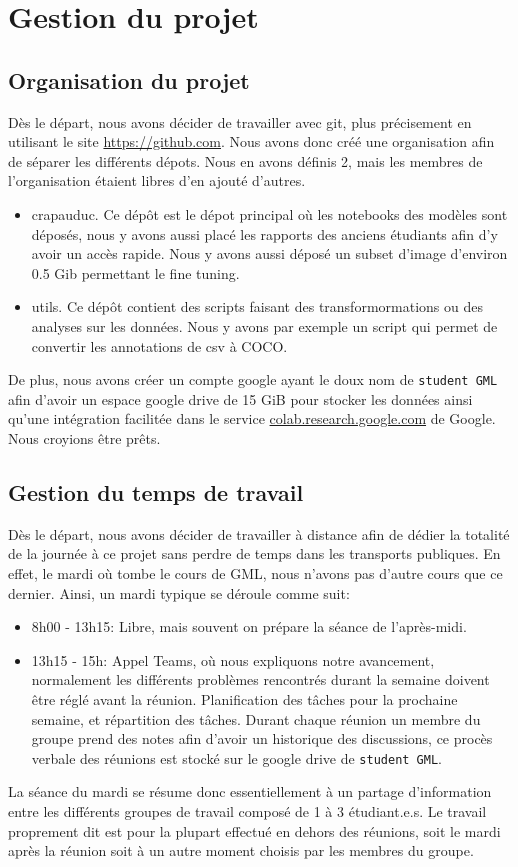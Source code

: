 \chapter{Gestion du projet}
\section{Organisation du projet}
Dès le départ, nous avons décider de travailler avec git, plus précisement 
en utilisant le site \url{https://github.com}. Nous avons donc créé une organisation afin de séparer les différents dépots. Nous en avons définis 2, mais les membres de l'organisation étaient libres d'en ajouté d'autres.
\begin{itemize}
    \item crapauduc.  Ce dépôt est le dépot principal où les notebooks des modèles sont déposés, nous y avons aussi placé les rapports des anciens étudiants afin d'y avoir un accès rapide. Nous y avons aussi déposé un subset d'image d'environ 0.5 Gib permettant le fine tuning.
    \item utils. Ce dépôt contient des scripts faisant des transformormations ou des analyses sur les données. Nous y avons par exemple un script qui permet de convertir les annotations de csv à COCO.
\end{itemize}

De plus, nous avons créer un compte google ayant le doux nom de \verb|student GML| afin d'avoir un espace google drive de 15 GiB pour stocker les données ainsi qu'une intégration facilitée dans le service \url{colab.research.google.com} de Google. Nous croyions être prêts.


\section{Gestion du temps de travail}
Dès le départ, nous avons décider de travailler à distance afin de dédier 
la totalité de la journée à ce projet sans perdre de temps dans les transports publiques. En effet, le mardi où tombe le cours de GML, nous n'avons pas d'autre cours que ce dernier. Ainsi, un mardi typique se déroule comme suit:
\begin{itemize}
    \item 8h00 - 13h15: Libre, mais souvent on prépare la séance de l'après-midi.
    \item 13h15 - 15h: Appel Teams, où nous expliquons notre avancement, normalement les différents problèmes rencontrés durant la semaine doivent être réglé avant la réunion. Planification des tâches pour la prochaine semaine, et répartition des tâches. Durant chaque réunion un membre du groupe prend des notes afin d'avoir un historique des discussions, ce procès verbale des réunions est stocké sur le google drive de \verb|student GML|.
    \label{item:seance}
\end{itemize}
La séance du mardi se résume donc essentiellement à un partage d'information entre les différents groupes de travail composé de 1 à 3 étudiant.e.s. Le travail proprement dit est pour la plupart effectué en dehors des réunions, soit le mardi après la réunion soit à un autre moment choisis par les membres du groupe.

